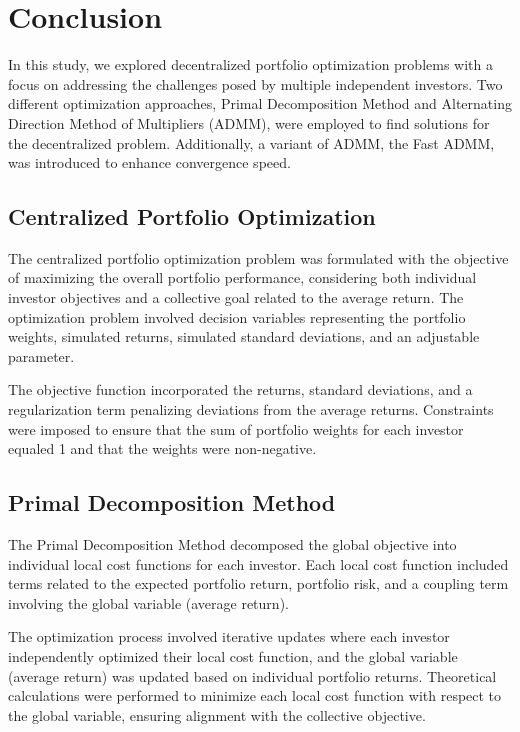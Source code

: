 \documentclass{article}
\begin{document}
	\section*{Conclusion}
	
	In this study, we explored decentralized portfolio optimization problems with a focus on addressing the challenges posed by multiple independent investors. Two different optimization approaches, Primal Decomposition Method and Alternating Direction Method of Multipliers (ADMM), were employed to find solutions for the decentralized problem. Additionally, a variant of ADMM, the Fast ADMM, was introduced to enhance convergence speed.
	
	\subsection*{Centralized Portfolio Optimization}
	
	The centralized portfolio optimization problem was formulated with the objective of maximizing the overall portfolio performance, considering both individual investor objectives and a collective goal related to the average return. The optimization problem involved decision variables representing the portfolio weights, simulated returns, simulated standard deviations, and an adjustable parameter.
	
	The objective function incorporated the returns, standard deviations, and a regularization term penalizing deviations from the average returns. Constraints were imposed to ensure that the sum of portfolio weights for each investor equaled 1 and that the weights were non-negative.
	
	\subsection*{Primal Decomposition Method}
	
	The Primal Decomposition Method decomposed the global objective into individual local cost functions for each investor. Each local cost function included terms related to the expected portfolio return, portfolio risk, and a coupling term involving the global variable (average return).
	
	The optimization process involved iterative updates where each investor independently optimized their local cost function, and the global variable (average return) was updated based on individual portfolio returns. Theoretical calculations were performed to minimize each local cost function with respect to the global variable, ensuring alignment with the collective objective.
	
\end{document}
